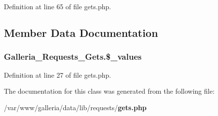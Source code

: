 Definition at line 65 of file gets.php.

\subsection{Member Data Documentation}
\subsubsection{\setlength{\rightskip}{0pt plus 5cm}Galleria\_\-Requests\_\-Gets.\$\_\-values\hspace{0.3cm}{\tt  [protected]}}\label{classGalleria__Requests__Gets_be9a7f2daf55a981241486af7ead43a8}




Definition at line 27 of file gets.php.

The documentation for this class was generated from the following file:\begin{CompactItemize}
\item 
/var/www/galleria/data/lib/requests/{\bf gets.php}\end{CompactItemize}
